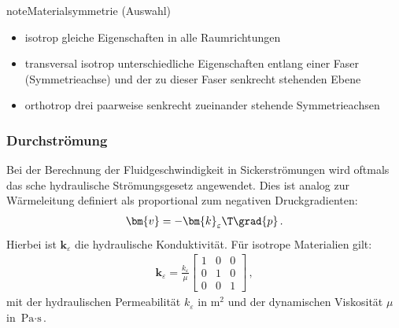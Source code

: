 \documentclass[letterpaper,10pt,german]{jupyterBook}
\begin{document}
\begin{sphinxadmonition}{note}{Materialsymmetrie (Auswahl)}
\begin{itemize}
\item {} 
\sphinxAtStartPar
isotrop \sphinxhyphen{} gleiche Eigenschaften in alle Raumrichtungen

\item {} 
\sphinxAtStartPar
transversal isotrop \sphinxhyphen{} unterschiedliche Eigenschaften entlang einer Faser (Symmetrieachse) und der zu dieser Faser senkrecht stehenden Ebene

\item {} 
\sphinxAtStartPar
orthotrop \sphinxhyphen{} drei paarweise senkrecht zueinander stehende Symmetrieachsen

\end{itemize}
\end{sphinxadmonition}




\subsubsection{Durchströmung}
\label{\detokenize{chapters/chapter1/elasticity:durchstromung}}
\sphinxAtStartPar
Bei der Berechnung der Fluidgeschwindigkeit in Sickerströmungen wird oftmals das sche hydraulische Strömungsgesetz angewendet. Dies ist analog zur Wärmeleitung definiert als proportional zum negativen Druckgradienten:
\begin{equation}\label{equation:chapters/chapter1/elasticity:darcy}
\begin{split}\bm{v} = - \bm{k}_{\varepsilon}\T  \grad{p} \, .\end{split}
\end{equation}
\sphinxAtStartPar
Hierbei ist \(\bm{k}_{\varepsilon}\) die hydraulische Konduktivität. Für isotrope Materialien gilt:
\begin{equation*}
\begin{split} \bm{k}_{\varepsilon} = \frac{k_{\varepsilon}}{\mu} \begin{bmatrix} 1 & 0 & 0 \\ 0 & 1 & 0 \\ 0 & 0 & 1\end{bmatrix}  \, ,\end{split}
\end{equation*}
\sphinxAtStartPar
mit der hydraulischen Permeabilität \(k_{\varepsilon}\) in \(\text{m}^2\) und der dynamischen Viskosität \(\mu\) in \(\text{Pa}\cdot \text{s}\).
\end{document}
